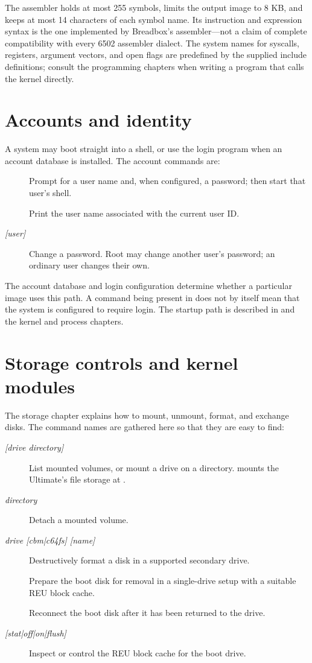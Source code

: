 The assembler holds at most 255 symbols, limits the output image to 8 KB, and keeps at most 14 characters of each symbol name. Its instruction and expression syntax is the one implemented by Breadbox's assembler—not a claim of complete compatibility with every 6502 assembler dialect. The system names for syscalls, registers, argument vectors, and open flags are predefined by the supplied include definitions; consult the programming chapters when writing a program that calls the kernel directly.

\section{Accounts and identity}

A system may boot straight into a shell, or use the login program when an account database is installed. The account commands are:

\begin{description}
  \item[] Prompt for a user name and, when configured, a password; then start that user's shell.
  \item[] Print the user name associated with the current user ID.
  \item[ \textit{[user]}] Change a password. Root may change another user's password; an ordinary user changes their own.
\end{description}

The account database and login configuration determine whether a particular image uses this path. A command being present in  does not by itself mean that the system is configured to require login. The startup path is described in  and the kernel and process chapters.

\section{Storage controls and kernel modules}

The storage chapter explains how to mount, unmount, format, and exchange disks. The command names are gathered here so that they are easy to find:

\begin{description}
  \item[ \textit{[drive directory]}] List mounted volumes, or mount a drive on a directory.  mounts the Ultimate's file storage at .
  \item[ \textit{directory}] Detach a mounted volume.
  \item[ \textit{drive [cbm|c64fs] [name]}] Destructively format a disk in a supported secondary drive.
  \item[] Prepare the boot disk for removal in a single-drive setup with a suitable REU block cache.
  \item[] Reconnect the boot disk after it has been returned to the drive.
  \item[ \textit{[stat|off|on|flush]}] Inspect or control the REU block cache for the boot drive.
\end{description}

